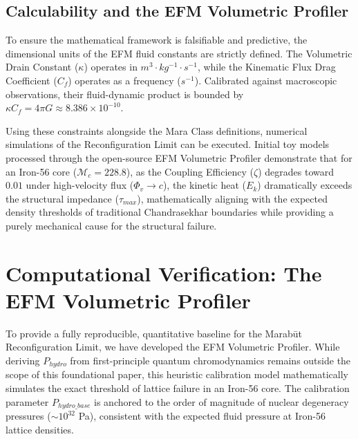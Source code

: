 \documentclass[11pt, a4paper]{article}
\begin{document}
  \subsection{Calculability and the EFM Volumetric Profiler}
  To ensure the mathematical framework is falsifiable and predictive, the dimensional units of the EFM fluid constants are strictly defined. The Volumetric Drain Constant ($\kappa$) operates in $m^3 \cdot kg^{-1} \cdot s^{-1}$, while the Kinematic Flux Drag Coefficient ($C_f$) operates as a frequency ($s^{-1}$). Calibrated against macroscopic observations, their fluid-dynamic product is bounded by $\kappa C_f = 4\pi G \approx 8.386 \times 10^{-10}$.

  Using these constraints alongside the Mara Class definitions, numerical simulations of the Reconfiguration Limit can be executed. Initial toy models processed through the open-source EFM Volumetric Profiler demonstrate that for an Iron-56 core ($\mathcal{M}_c = 228.8$), as the Coupling Efficiency ($\zeta$) degrades toward $0.01$ under high-velocity flux ($\Phi_v \to c$), the kinetic heat ($E_k$) dramatically exceeds the structural impedance ($\tau_{max}$), mathematically aligning with the expected density thresholds of traditional Chandrasekhar boundaries while providing a purely mechanical cause for the structural failure.

\clearpage
\section{Computational Verification: The EFM Volumetric Profiler}
  To provide a fully reproducible, quantitative baseline for the Marab\={u}t Reconfiguration Limit, we have developed the EFM Volumetric Profiler. While deriving $P_{hydro}$ from first-principle quantum chromodynamics remains outside the scope of this foundational paper, this heuristic calibration model mathematically simulates the exact threshold of lattice failure in an Iron-56 core. The calibration parameter $P_{hydro\_base}$ is anchored to the order of magnitude of nuclear degeneracy pressures ($\sim 10^{32}$ Pa), consistent with the expected fluid pressure at Iron-56 lattice densities.
  
\end{document}
